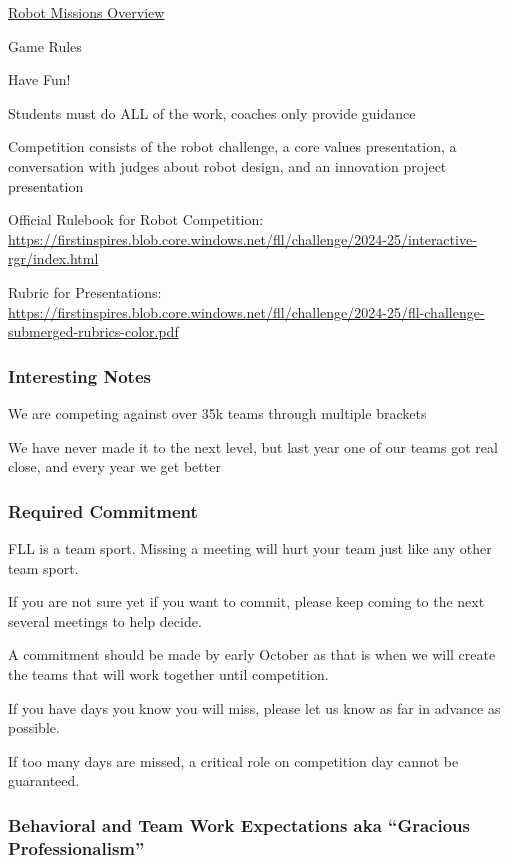 \href{https://youtu.be/J5u-2q_K3O0}{Robot Missions Overview}

Game Rules

Have Fun!

Students must do ALL of the work, coaches only provide guidance

Competition consists of the robot challenge, a core values presentation,
a conversation with judges about robot design, and an innovation project
presentation

Official Rulebook for Robot Competition:
\url{https://firstinspires.blob.core.windows.net/fll/challenge/2024-25/interactive-rgr/index.html}

Rubric for Presentations:
\url{https://firstinspires.blob.core.windows.net/fll/challenge/2024-25/fll-challenge-submerged-rubrics-color.pdf}

\hypertarget{interesting-notes}{%
\subsubsection{Interesting Notes}\label{interesting-notes}}

We are competing against over 35k teams through multiple brackets

We have never made it to the next level, but last year one of our teams
got real close, and every year we get better

\hypertarget{required-commitment}{%
\subsubsection{Required Commitment}\label{required-commitment}}

FLL is a team sport. Missing a meeting will hurt your team just like any
other team sport.

If you are not sure yet if you want to commit, please keep coming to the
next several meetings to help decide.

A commitment should be made by early October as that is when we will
create the teams that will work together until competition.

If you have days you know you will miss, please let us know as far in
advance as possible.

If too many days are missed, a critical role on competition day cannot
be guaranteed.

\hypertarget{behavioral-and-team-work-expectations-aka-gracious-professionalism}{%
\subsubsection{Behavioral and Team Work Expectations aka ``Gracious
Professionalism''}\label{behavioral-and-team-work-expectations-aka-gracious-professionalism}}


